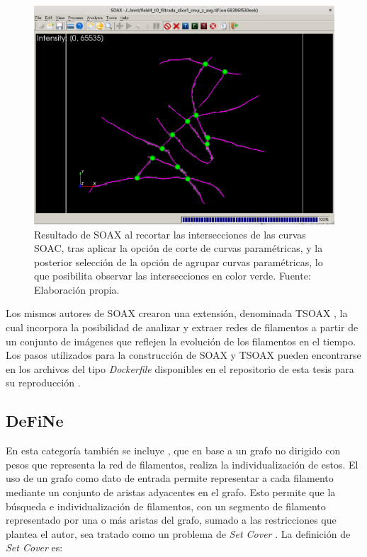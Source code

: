 \begin{figure}[h]
    \centering
    \includegraphics[scale=0.3]{evalImages/field4-nodes-soax.png}
    \caption[Identificaci\'on de intersecciones de curvas SOAC]{Resultado de SOAX al recortar las intersecciones de las curvas SOAC, tras aplicar la opci\'on de corte de curvas param\'etricas, y la posterior selecci\'on de la opci\'on de agrupar curvas param\'etricas, lo que posibilita observar las intersecciones en color verde. Fuente: Elaboraci\'on propia.}
    \label{fig:SOAXexampleJunctions}
\end{figure}


Los mismos autores de SOAX crearon una extensi\'on, denominada TSOAX , la cual incorpora la posibilidad de analizar y extraer redes de filamentos a partir de un conjunto de im\'agenes que reflejen la evoluci\'on de los filamentos en el tiempo. Los pasos utilizados para la construcci\'on de SOAX y TSOAX  pueden encontrarse en los archivos del tipo {\it Dockerfile} disponibles en el repositorio de esta tesis para su reproducci\'on .



\subsection{DeFiNe}
En esta categor\'ia tambi\'en se incluye \citet{breuer2015define}, que en base a un grafo no dirigido con pesos que representa la red de filamentos, realiza la individualizaci\'on de estos. El uso de un grafo como dato de entrada permite representar a cada filamento mediante un conjunto de aristas adyacentes en el grafo. Esto permite que la b\'usqueda e individualizaci\'on de filamentos, con un segmento de filamento representado por una o m\'as aristas del grafo, sumado a las restricciones que plantea el autor, sea tratado como un problema de {\it Set Cover} . La definici\'on de {\it Set Cover} es:

